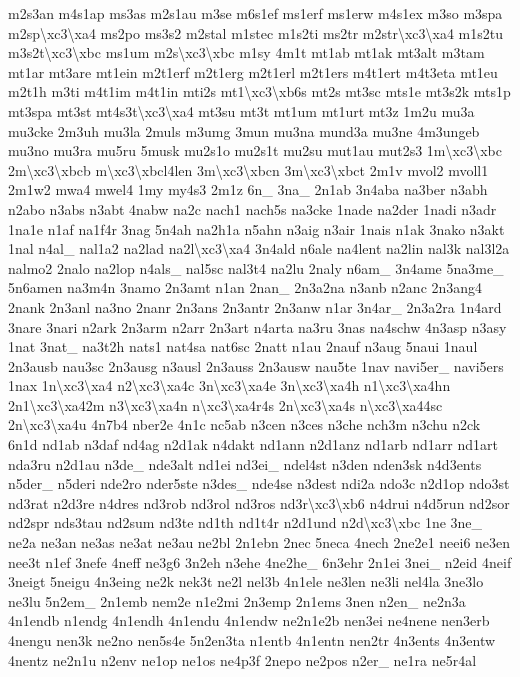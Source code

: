 \begin{DoxyCompactItemize}
m2s3an m4s1ap ms3as m2s1au m3se m6s1ef ms1erf ms1erw m4s1ex m3so m3spa m2sp\textbackslash{}xc3\textbackslash{}xa4 ms2po ms3s2 m2stal m1stec m1s2ti ms2tr m2str\textbackslash{}xc3\textbackslash{}xa4 m1s2tu m3s2t\textbackslash{}xc3\textbackslash{}xbc ms1um m2s\textbackslash{}xc3\textbackslash{}xbc m1sy 4m1t mt1ab mt1ak mt3alt m3tam mt1ar mt3are mt1ein m2t1erf m2t1erg m2t1erl m2t1ers m4t1ert m4t3eta mt1eu m2t1h m3ti m4t1im m4t1in mti2s mt1\textbackslash{}xc3\textbackslash{}xb6s mt2s mt3sc mts1e mt3s2k mts1p mt3spa mt3st mt4s3t\textbackslash{}xc3\textbackslash{}xa4 mt3su mt3t mt1um mt1urt mt3z 1m2u mu3a mu3cke 2m3uh mu3la 2muls m3umg 3mun mu3na mund3a mu3ne 4m3ungeb mu3no mu3ra mu5ru 5musk mu2s1o mu2s1t mu2su mut1au mut2s3 1m\textbackslash{}xc3\textbackslash{}xbc 2m\textbackslash{}xc3\textbackslash{}xbcb m\textbackslash{}xc3\textbackslash{}xbcl4len 3m\textbackslash{}xc3\textbackslash{}xbcn 3m\textbackslash{}xc3\textbackslash{}xbct 2m1v mvol2 mvoll1 2m1w2 mwa4 mwel4 1my my4s3 2m1z 6n\-\_\- 3na\-\_\- 2n1ab 3n4aba na3ber n3abh n2abo n3abs n3abt 4nabw na2c nach1 nach5s na3cke 1nade na2der 1nadi n3adr 1na1e n1af na1f4r 3nag 5n4ah na2h1a n5ahn n3aig n3air 1nais n1ak 3nako n3akt 1nal n4al\-\_\- nal1a2 na2lad na2l\textbackslash{}xc3\textbackslash{}xa4 3n4ald n6ale na4lent na2lin nal3k nal3l2a nalmo2 2nalo na2lop n4als\-\_\- nal5sc nal3t4 na2lu 2naly n6am\-\_\- 3n4ame 5na3me\-\_\- 5n6amen na3m4n 3namo 2n3amt n1an 2nan\-\_\- 2n3a2na n3anb n2anc 2n3ang4 2nank 2n3anl na3no 2nanr 2n3ans 2n3antr 2n3anw n1ar 3n4ar\-\_\- 2n3a2ra 1n4ard 3nare 3nari n2ark 2n3arm n2arr 2n3art n4arta na3ru 3nas na4schw 4n3asp n3asy 1nat 3nat\-\_\- na3t2h nats1 nat4sa nat6sc 2natt n1au 2nauf n3aug 5naui 1naul 2n3ausb nau3sc 2n3ausg n3ausl 2n3auss 2n3ausw nau5te 1nav navi5er\-\_\- navi5ers 1nax 1n\textbackslash{}xc3\textbackslash{}xa4 n2\textbackslash{}xc3\textbackslash{}xa4c 3n\textbackslash{}xc3\textbackslash{}xa4e 3n\textbackslash{}xc3\textbackslash{}xa4h n1\textbackslash{}xc3\textbackslash{}xa4hn 2n1\textbackslash{}xc3\textbackslash{}xa42m n3\textbackslash{}xc3\textbackslash{}xa4n n\textbackslash{}xc3\textbackslash{}xa4r4s 2n\textbackslash{}xc3\textbackslash{}xa4s n\textbackslash{}xc3\textbackslash{}xa44sc 2n\textbackslash{}xc3\textbackslash{}xa4u 4n7b4 nber2e 4n1c nc5ab n3cen n3ces n3che nch3m n3chu n2ck 6n1d nd1ab n3daf nd4ag n2d1ak n4dakt nd1ann n2d1anz nd1arb nd1arr nd1art nda3ru n2d1au n3de\-\_\- nde3alt nd1ei nd3ei\-\_\- ndel4st n3den nden3sk n4d3ents n5der\-\_\- n5deri nde2ro nder5ste n3des\-\_\- nde4se n3dest ndi2a ndo3c n2d1op ndo3st nd3rat n2d3re n4dres nd3rob nd3rol nd3ros nd3r\textbackslash{}xc3\textbackslash{}xb6 n4drui n4d5run nd2sor nd2spr nds3tau nd2sum nd3te nd1th nd1t4r n2d1und n2d\textbackslash{}xc3\textbackslash{}xbc 1ne 3ne\-\_\- ne2a ne3an ne3as ne3at ne3au ne2bl 2n1ebn 2nec 5neca 4nech 2ne2e1 neei6 ne3en nee3t n1ef 3nefe 4neff ne3g6 3n2eh n3ehe 4ne2he\-\_\- 6n3ehr 2n1ei 3nei\-\_\- n2eid 4neif 3neigt 5neigu 4n3eing ne2k nek3t ne2l nel3b 4n1ele ne3len ne3li nel4la 3ne3lo ne3lu 5n2em\-\_\- 2n1emb nem2e n1e2mi 2n3emp 2n1ems 3nen n2en\-\_\- ne2n3a 4n1endb n1endg 4n1endh 4n1endu 4n1endw ne2n1e2b nen3ei ne4nene nen3erb 4nengu nen3k ne2no nen5s4e 5n2en3ta n1entb 4n1entn nen2tr 4n3ents 4n3entw 4nentz ne2n1u n2env ne1op ne1os ne4p3f 2nepo ne2pos n2er\-\_\- ne1ra ne5r4al 
\end{DoxyCompactItemize}
